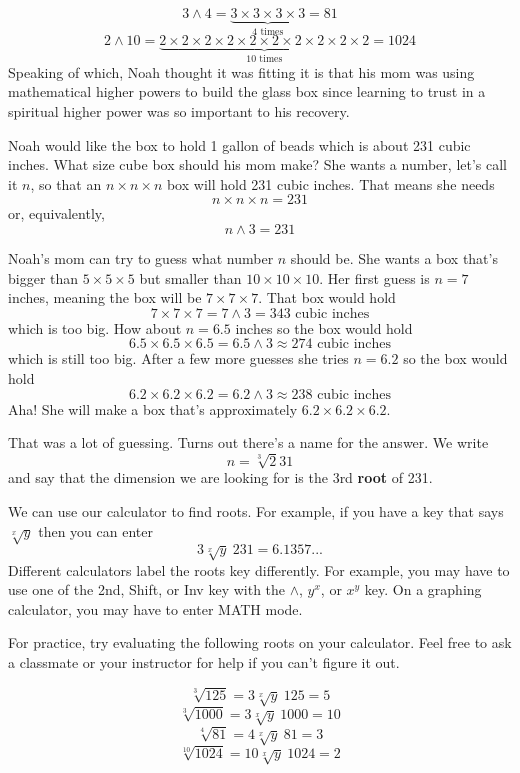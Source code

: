 $$3 \land 4 = \underbrace{3 \times 3 \times 3 \times 3}_{4 \text{ times}} = 81$$
$$2 \land 10 = \underbrace{2 \times 2 \times 2 \times 2 \times 2 \times 2 \times 2 \times 2 \times 2 \times 2}_{10 \text{ times}}= 1024$$
Speaking of which,  Noah thought it was fitting it is that his mom was using mathematical higher powers to build the glass box since learning to trust in a spiritual higher power was so important to his recovery.

Noah would like the box to hold 1 gallon of beads which is about 231 cubic inches.  What size cube box should his mom make?  She wants a number, let's call it $n$, so that an $n \times n \times n$ box will hold 231 cubic inches.  That means she needs $$n \times n \times n = 231$$ or, equivalently, $$n \land 3 = 231$$

Noah's mom can try to guess what number $n$ should be.  She wants a box that's bigger than $5  \times 5 \times 5$ but smaller than $10 \times 10 \times 10$.  Her first guess is $n=7$ inches, meaning the box will be $7 \times 7 \times 7$.  That box would hold $$7 \times 7 \times 7 = 7 \land 3 = 343 \text{ cubic inches}$$ which is too big.  How about $n = 6.5$ inches so the box would hold $$6.5 \times 6.5 \times 6.5 = 6.5 \land 3  \approx 274 \text{ cubic inches}$$ which is still too big. After a few more guesses she tries $n = 6.2$ so the box would hold $$6.2 \times 6.2 \times 6.2 = 6.2 \land 3 \approx 238 \text{ cubic inches}$$ Aha!  She will make a box that's approximately $6.2 \times 6.2 \times 6.2$.

That was a lot of guessing.  Turns out there's a name for the answer.  We write $$n = \sqrt[3]231$$ and say that the dimension we are looking for is the 3rd \textbf{root} of 231.  

We can use our calculator to find roots.  For example, if you have a key that says $\sqrt[x]{y}$ then you can enter
$$3 \sqrt[x]{y} ~231 =  6.1357...$$
Different calculators label the roots key differently.  For example, you may have to use one of the 2nd, Shift, or Inv key with the $\land$, $y^x$, or $x^y$ key.  On a graphing calculator, you may have to enter MATH mode.  

For practice, try evaluating the following roots on your calculator. Feel free to ask a classmate or your instructor for help if you can't figure it out.

$$\sqrt[3]{125} = 3 \sqrt[x]{y}~ 125= 5$$
$$\sqrt[3]{1000} = 3 \sqrt[x]{y}~ 1000 = 10$$
$$\sqrt[4]{81} = 4 \sqrt[x]{y}~ 81 = 3$$
$$\sqrt[10]{1024} = 10 \sqrt[x]{y}~ {1024} = 2$$

